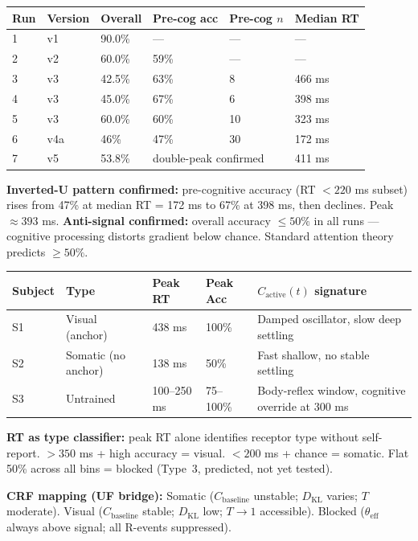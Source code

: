 \documentclass[12pt, a4paper]{article}
\begin{document}
\begin{derivedbox}[title={P0-H: All Run Results (v1--v5)}]
\begin{center}
\renewcommand{\arraystretch}{1.35}
\begin{tabular}{p{1cm} p{1.5cm} p{2.2cm} p{2.2cm} p{1.5cm} p{2cm}}
\toprule
\textbf{Run} & \textbf{Version} & \textbf{Overall} & \textbf{Pre-cog acc} & \textbf{Pre-cog $n$} & \textbf{Median RT} \\
\midrule
1 & v1 & 90.0\% & --- & --- & --- \\
2 & v2 & 60.0\% & 59\% & --- & --- \\
3 & v3 & 42.5\% & 63\% & 8 & 466 ms \\
4 & v3 & 45.0\% & 67\% & 6 & 398 ms \\
5 & v3 & 60.0\% & 60\% & 10 & 323 ms \\
6 & v4a & 46\% & 47\% & 30 & 172 ms \\
7 & v5 & 53.8\% & \multicolumn{2}{l}{double-peak confirmed} & 411 ms \\
\bottomrule
\end{tabular}
\end{center}

\textbf{Inverted-U pattern confirmed:} pre-cognitive accuracy (RT $< 220$ ms subset) rises
from 47\% at median RT = 172 ms to 67\% at 398 ms, then declines. Peak $\approx 393$ ms.
\textbf{Anti-signal confirmed:} overall accuracy $\leq 50\%$ in all runs --- cognitive
processing distorts gradient below chance. Standard attention theory predicts $\geq 50\%$.
\end{derivedbox}

\begin{derivedbox}[title={Three Receptor Types: CRF Structural Signatures}]
\begin{center}
\renewcommand{\arraystretch}{1.35}
\begin{tabular}{p{1.5cm} p{2.5cm} p{1.5cm} p{1.8cm} p{4.5cm}}
\toprule
\textbf{Subject} & \textbf{Type} & \textbf{Peak RT} & \textbf{Peak Acc} & \textbf{$C_{\mathrm{active}}(t)$ signature} \\
\midrule
S1 & Visual (anchor) & 438 ms & 100\% & Damped oscillator, slow deep settling \\
S2 & Somatic (no anchor) & 138 ms & 50\% & Fast shallow, no stable settling \\
S3 & Untrained & 100--250 ms & 75--100\% & Body-reflex window, cognitive override at 300 ms \\
\bottomrule
\end{tabular}
\end{center}

\textbf{RT as type classifier:} peak RT alone identifies receptor type without self-report.
$>350$ ms + high accuracy = visual. $<200$ ms + chance = somatic.
Flat 50\% across all bins = blocked (Type~3, predicted, not yet tested).

\textbf{CRF mapping (UF bridge):}
Somatic ($C_{\mathrm{baseline}}$ unstable; $D_{\mathrm{KL}}$ varies; $T$ moderate).
Visual ($C_{\mathrm{baseline}}$ stable; $D_{\mathrm{KL}}$ low; $T \to 1$ accessible).
Blocked ($\theta_{\mathrm{eff}}$ always above signal; all R-events suppressed).
\end{derivedbox}
\end{document}
